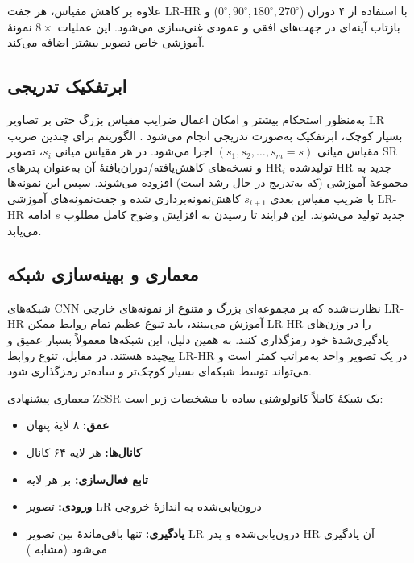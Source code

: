 علاوه بر کاهش مقیاس، هر جفت LR-HR با استفاده از ۴ دوران
($0^\circ, 90^\circ, 180^\circ, 270^\circ$) و بازتاب آینه‌ای در
جهت‌های افقی و عمودی غنی‌سازی می‌شود. این عملیات $8\times$ نمونهٔ
آموزشی خاص تصویر بیشتر اضافه می‌کند.

\subsection{ابرتفکیک تدریجی}

به‌منظور استحکام بیشتر و امکان اعمال ضرایب مقیاس بزرگ حتی بر تصاویر
LR بسیار کوچک، ابرتفکیک به‌صورت تدریجی انجام می‌شود
\cite{GlasnerSR2009}. الگوریتم برای چندین ضریب مقیاس
میانی $(s_1, s_2, \ldots, s_m = s)$ اجرا می‌شود. در هر مقیاس میانی
$s_i$، تصویر SR تولیدشده $\text{HR}_i$ و نسخه‌های
کاهش‌یافته/دوران‌یافتهٔ آن به‌عنوان پدرهای HR جدید به مجموعهٔ
آموزشی (که به‌تدریج در حال رشد است) افزوده می‌شوند. سپس این نمونه‌ها
با ضریب مقیاس بعدی $s_{i+1}$ کاهش‌نمونه‌برداری شده و جفت‌نمونه‌های
آموزشی LR-HR جدید تولید می‌شوند. این فرایند تا رسیدن به افزایش
وضوح کامل مطلوب $s$ ادامه می‌یابد.

\subsection{معماری و بهینه‌سازی شبکه}
\label{subsec:arch_optim}

شبکه‌های CNN نظارت‌شده که بر مجموعه‌ای بزرگ و متنوع از نمونه‌های
خارجی LR-HR آموزش می‌بینند، باید تنوع عظیم تمام روابط ممکن LR-HR
را در وزن‌های یادگیری‌شدهٔ خود رمزگذاری کنند. به همین دلیل، این
شبکه‌ها معمولاً بسیار عمیق و پیچیده هستند. در مقابل، تنوع روابط
LR-HR در یک تصویر واحد به‌مراتب کمتر است و می‌تواند توسط شبکه‌ای
بسیار کوچک‌تر و ساده‌تر رمزگذاری شود.

معماری پیشنهادی ZSSR یک شبکهٔ کاملاً کانولوشنی ساده با مشخصات زیر است:

\begin{itemize}
	\item \textbf{عمق:} ۸ لایهٔ پنهان
	\item \textbf{کانال‌ها:} هر لایه ۶۴ کانال
	\item \textbf{تابع فعال‌سازی:}  بر هر لایه
	\item \textbf{ورودی:} تصویر LR درون‌یابی‌شده به اندازهٔ خروجی
	\item \textbf{یادگیری:} تنها باقی‌ماندهٔ بین
	تصویر LR درون‌یابی‌شده و پدر HR آن یادگیری می‌شود (مشابه
	\cite{zhang2018imagesuperresolutionusingdeep})
\end{itemize}

